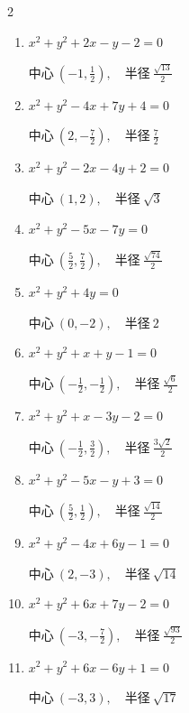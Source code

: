 \begin{multicols}{2}
\begin{enumerate}
  \item $x^{2}+y^{2}+2x-y-2=0$

        $\displaystyle 中心\: \left(-1,\frac{1}{2}\right), \quad 半径 \ \frac{\sqrt{13}}{2}$

  \item $x^{2}+y^{2}-4x+7y+4=0$

        $\displaystyle 中心\: \left(2,-\frac{7}{2}\right), \quad 半径 \ \frac{7}{2}$

  \item $x^{2}+y^{2}-2x-4y+2=0$

        $\displaystyle 中心\: \left(1,2\right), \quad 半径 \ \sqrt{3}$

  \item $x^{2}+y^{2}-5x-7y=0$

        $\displaystyle 中心\: \left(\frac{5}{2},\frac{7}{2}\right), \quad 半径 \ \frac{\sqrt{74}}{2}$

  \item $x^{2}+y^{2}+4y=0$

        $\displaystyle 中心\: \left(0,-2\right), \quad 半径 \ 2$

  \item $x^{2}+y^{2}+x+y-1=0$

        $\displaystyle 中心\: \left(-\frac{1}{2},-\frac{1}{2}\right), \quad 半径 \ \frac{\sqrt{6}}{2}$

  \item $x^{2}+y^{2}+x-3y-2=0$

        $\displaystyle 中心\: \left(-\frac{1}{2},\frac{3}{2}\right), \quad 半径 \ \frac{3\sqrt{2}}{2}$

  \item $x^{2}+y^{2}-5x-y+3=0$

        $\displaystyle 中心\: \left(\frac{5}{2},\frac{1}{2}\right), \quad 半径 \ \frac{\sqrt{14}}{2}$

  \item $x^{2}+y^{2}-4x+6y-1=0$

        $\displaystyle 中心\: \left(2,-3\right), \quad 半径 \ \sqrt{14}$

  \item $x^{2}+y^{2}+6x+7y-2=0$

        $\displaystyle 中心\: \left(-3,-\frac{7}{2}\right), \quad 半径 \ \frac{\sqrt{93}}{2}$

  \item $x^{2}+y^{2}+6x-6y+1=0$

        $\displaystyle 中心\: \left(-3,3\right), \quad 半径 \ \sqrt{17}$


\end{enumerate}
\end{multicols}
